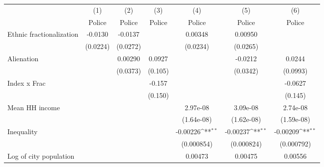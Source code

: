 {
\def\sym#1{\ifmmode^{#1}\else\(^{#1}\)\fi}
\begin{tabular}{l*{6}{c}}
\hline\hline
                    &\multicolumn{1}{c}{(1)}&\multicolumn{1}{c}{(2)}&\multicolumn{1}{c}{(3)}&\multicolumn{1}{c}{(4)}&\multicolumn{1}{c}{(5)}&\multicolumn{1}{c}{(6)}\\
                    &\multicolumn{1}{c}{Police}&\multicolumn{1}{c}{Police}&\multicolumn{1}{c}{Police}&\multicolumn{1}{c}{Police}&\multicolumn{1}{c}{Police}&\multicolumn{1}{c}{Police}\\
\hline
Ethnic fractionalization&     -0.0130         &     -0.0137         &                     &     0.00348         &     0.00950         &                     \\
                    &    (0.0224)         &    (0.0272)         &                     &    (0.0234)         &    (0.0265)         &                     \\
[1em]
Alienation          &                     &     0.00290         &      0.0927         &                     &     -0.0212         &      0.0244         \\
                    &                     &    (0.0373)         &     (0.105)         &                     &    (0.0342)         &    (0.0993)         \\
[1em]
Index x Frac        &                     &                     &      -0.157         &                     &                     &     -0.0627         \\
                    &                     &                     &     (0.150)         &                     &                     &     (0.145)         \\
[1em]
Mean HH income      &                     &                     &                     &    2.97e-08         &    3.09e-08         &    2.74e-08         \\
                    &                     &                     &                     &  (1.64e-08)         &  (1.62e-08)         &  (1.59e-08)         \\
[1em]
Inequality          &                     &                     &                     &    -0.00226\sym{**} &    -0.00237\sym{**} &    -0.00209\sym{**} \\
                    &                     &                     &                     &  (0.000854)         &  (0.000824)         &  (0.000792)         \\
[1em]
Log of city population&                     &                     &                     &     0.00473         &     0.00475         &     0.00556         \\

\end{tabular}}
